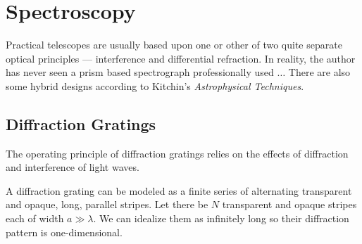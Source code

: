 %
\setcounter{count}{\value{enumi}}
\section{Spectroscopy}

Practical telescopes are usually based upon one or other of two quite separate optical
principles --- interference and differential refraction. In reality, the author has never
seen a prism based spectrograph professionally used $\ldots$ There are also some 
hybrid designs according to Kitchin's {\it Astrophysical Techniques}. 

\subsection{Diffraction Gratings}

The operating principle of diffraction gratings relies on the effects of diffraction 
and interference of light waves. 

A diffraction grating can be modeled as a finite series of alternating transparent 
and opaque, long, parallel stripes. Let there be $N$ transparent and opaque stripes 
each of width $a\gg\lambda$. We can idealize them as infinitely long so their diffraction
pattern is one-dimensional.

